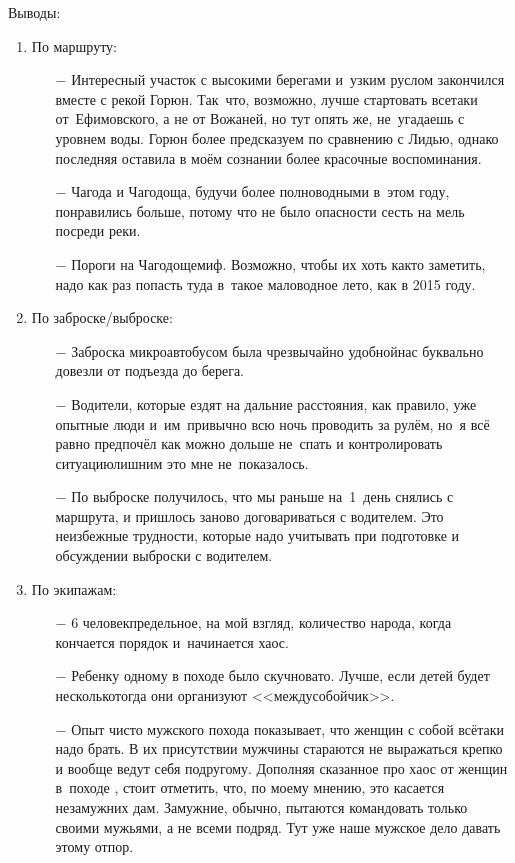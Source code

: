Выводы:
\begin{enumerate}
\item По маршруту:
	\begin{enumerate}
	\item[$-$] Интересный участок с высокими берегами и~узким руслом закончился вместе с рекой Горюн. Так~что, возможно, лучше стартовать все\sdash таки от~Ефимовского, а не от Вожаней, но тут опять же, не~угадаешь с уровнем воды. Горюн более предсказуем по сравнению с Лидью, однако последняя оставила в моём сознании более красочные воспоминания.
	\item[$-$] Чагода и Чагодоща, будучи более полноводными в~этом году, понравились больше, потому что не было опасности сесть на мель посреди реки.
	\item[$-$] Пороги на Чагодоще\mdash миф. Возможно, чтобы их хоть как\sdash то заметить, надо как раз попасть туда в~такое маловодное лето, как в 2015 году.	
	\end{enumerate}	
\item По заброске/выброске:
	\begin{enumerate}
	\item[$-$] Заброска микроавтобусом была чрезвычайно удобной\mdash нас буквально довезли от подъезда до берега.
	\item[$-$] Водители, которые ездят на дальние расстояния, как правило, уже опытные люди и~им~привычно всю ночь проводить за рулём, но~я всё равно предпочёл как можно дольше не~спать и контролировать ситуацию\mdash лишним это мне не~показалось.
	\item[$-$] По выброске получилось, что мы раньше на~1~день снялись с маршрута, и пришлось заново договариваться с водителем. Это неизбежные трудности, которые надо учитывать при подготовке и обсуждении выброски с водителем.
	\end{enumerate}	
\item По экипажам:
	\begin{enumerate}
	\item[$-$] 6 человек\mdash предельное, на мой взгляд, количество народа, когда кончается порядок и~начинается хаос.
	\item[$-$] Ребенку одному в походе было скучновато. Лучше, если детей будет несколько\mdash тогда они организуют <<междусобойчик>>.
	\item[$-$] Опыт чисто мужского похода показывает, что женщин с собой всё\sdash таки надо брать. В их присутствии мужчины стараются не выражаться крепко и вообще ведут себя по\sdash другому. Дополняя сказанное про хаос от женщин в~походе \cite{Квадригин}, стоит отметить, что, по моему мнению, это касается незамужних дам. Замужние, обычно, пытаются командовать только своими мужьями, а не всеми подряд. Тут уже наше мужское дело давать этому отпор.

\end{enumerate}
\end{enumerate}
